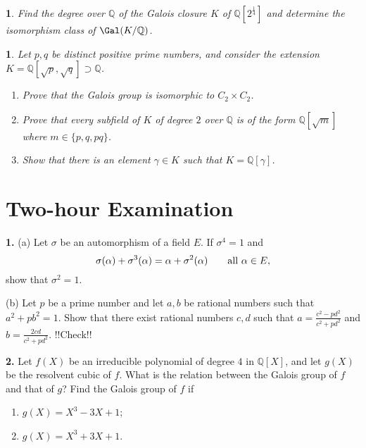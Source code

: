 \documentclass[a4paper,11pt,final,openany]{memoir}
\newtheorem{exercise}[Y]{}
\theoremstyle{nonumberplain}
\begin{document}
\begin{exercise}
\label{x81} Find the degree over ${\mathbb{Q}}$ of the Galois closure $K$ of
${\mathbb{Q}}[2^{\frac14}]$ and determine the isomorphism class of
$\Gal(K/{\mathbb{Q}})$.
\end{exercise}

\begin{exercise}
\label{x82} Let $p,q$ be distinct positive prime numbers, and consider the
extension $K={\mathbb{Q}}[\sqrt p,\sqrt q]\supset{\mathbb{Q}}$.

\begin{enumerate}
\item Prove that the Galois group is isomorphic to $C_{2}\times C_{2}$.

\item Prove that every subfield of $K$ of degree $2$ over ${\mathbb{Q}}$ is of
the form ${\mathbb{Q}}[\sqrt m]$ where $m\in\{p,q, pq\}$.

\item Show that there is an element $\gamma\in K$ such that $K={\mathbb{Q}%
}[\gamma]$.
\end{enumerate}
\end{exercise}

\clearpage


\chapter{Two-hour Examination}

\textbf{1.} (a) Let $\sigma$ be an automorphism of a field $E$. If $\sigma
^{4}=1$ and
\[
\sigma(\alpha)+\sigma^{3}(\alpha)=\alpha+\sigma^{2}(\alpha)\qquad
\text{\textrm{all }} \alpha\in E,
\]
show that $\sigma^{2}=1$.

\noindent(b) Let $p$ be a prime number and let $a,b$ be rational numbers such
that $a^{2}+pb^{2}=1$. Show that there exist rational numbers $c,d$ such that
$a=\frac{c^{2}-pd^{2}}{c^{2}+pd^{2}}$ and $b=\frac{2cd}{c^{2}+pd^{2}}$.
\bigskip!!Check!!

\medskip\noindent\textbf{2.} Let $f(X)$ be an irreducible polynomial of degree
$4$ in ${\mathbb{Q}}[X]$, and let $g(X)$ be the resolvent cubic of $f$. What
is the relation between the Galois group of $f$ and that of $g$? Find the
Galois group of $f$ if

\begin{enumerate}
\item $g(X)=X^{3}-3X+1$;

\item $g(X)=X^{3}+3X+1$.
\end{enumerate}
\end{document}
